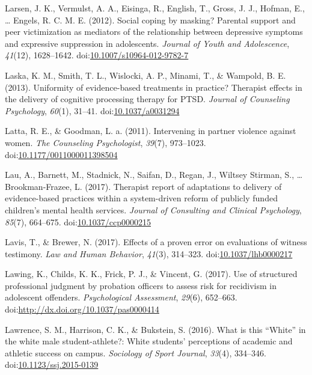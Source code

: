 \documentclass[english,man]{apa6}
\theoremstyle{definition}
\theoremstyle{definition}
\theoremstyle{definition}
\theoremstyle{remark}
\begin{document}
\hypertarget{ref-Larsen2012}{}
Larsen, J. K., Vermulst, A. A., Eisinga, R., English, T., Gross, J. J.,
Hofman, E., \ldots{} Engels, R. C. M. E. (2012). Social coping by
masking? Parental support and peer victimization as mediators of the
relationship between depressive symptoms and expressive suppression in
adolescents. \emph{Journal of Youth and Adolescence}, \emph{41}(12),
1628--1642.
doi:\href{https://doi.org/10.1007/s10964-012-9782-7}{10.1007/s10964-012-9782-7}

\hypertarget{ref-Laska2013}{}
Laska, K. M., Smith, T. L., Wislocki, A. P., Minami, T., \& Wampold, B.
E. (2013). Uniformity of evidence-based treatments in practice?
Therapist effects in the delivery of cognitive processing therapy for
PTSD. \emph{Journal of Counseling Psychology}, \emph{60}(1), 31--41.
doi:\href{https://doi.org/10.1037/a0031294}{10.1037/a0031294}

\hypertarget{ref-Latta2011}{}
Latta, R. E., \& Goodman, L. a. (2011). Intervening in partner violence
against women. \emph{The Counseling Psychologist}, \emph{39}(7),
973--1023.
doi:\href{https://doi.org/10.1177/0011000011398504}{10.1177/0011000011398504}

\hypertarget{ref-Lau2017}{}
Lau, A., Barnett, M., Stadnick, N., Saifan, D., Regan, J., Wiltsey
Stirman, S., \ldots{} Brookman-Frazee, L. (2017). Therapist report of
adaptations to delivery of evidence-based practices within a
system-driven reform of publicly funded children's mental health
services. \emph{Journal of Consulting and Clinical Psychology},
\emph{85}(7), 664--675.
doi:\href{https://doi.org/10.1037/ccp0000215}{10.1037/ccp0000215}

\hypertarget{ref-Lavis2017}{}
Lavis, T., \& Brewer, N. (2017). Effects of a proven error on
evaluations of witness testimony. \emph{Law and Human Behavior},
\emph{41}(3), 314--323.
doi:\href{https://doi.org/10.1037/lhb0000217}{10.1037/lhb0000217}

\hypertarget{ref-Lawing2017}{}
Lawing, K., Childs, K. K., Frick, P. J., \& Vincent, G. (2017). Use of
structured professional judgment by probation officers to assess risk
for recidivism in adolescent offenders. \emph{Psychological Assessment},
\emph{29}(6), 652--663.
doi:\href{https://doi.org/http://dx.doi.org/10.1037/pas0000414}{http://dx.doi.org/10.1037/pas0000414}

\hypertarget{ref-Lawrence2016}{}
Lawrence, S. M., Harrison, C. K., \& Bukstein, S. (2016). What is this
``White'' in the white male student-athlete?: White students'
perceptions of academic and athletic success on campus. \emph{Sociology
of Sport Journal}, \emph{33}(4), 334--346.
doi:\href{https://doi.org/10.1123/ssj.2015-0139}{10.1123/ssj.2015-0139}
\end{document}

